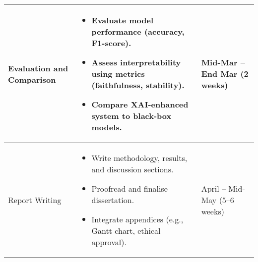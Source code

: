 \begin{longtable}{|p{5cm}|p{6cm}|p{4cm}|}
Evaluation and Comparison & 
\begin{itemize}
    \item Evaluate model performance (accuracy, F1-score).
    \item Assess interpretability using metrics (faithfulness, stability).
    \item Compare XAI-enhanced system to black-box models.
\end{itemize} & 
Mid-Mar -- End Mar (2 weeks) \\
\hline

Report Writing & 
\begin{itemize}
    \item Write methodology, results, and discussion sections.
    \item Proofread and finalise dissertation.
    \item Integrate appendices (e.g., Gantt chart, ethical approval).
\end{itemize} & 
April -- Mid-May (5--6 weeks) \\
\hline

\end{longtable}

